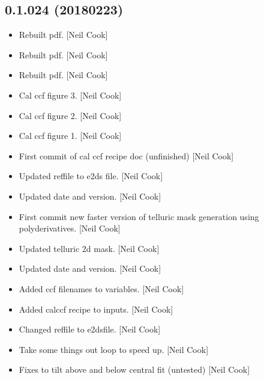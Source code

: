 \documentclass[a4paper,10pt,english]{report}
\begin{document}
\subsection{0.1.024 (2018\sphinxhyphen{}02\sphinxhyphen{}23)}
\label{\detokenize{misc/changelog:id499}}\begin{itemize}
\item {} 
Rebuilt pdf. {[}Neil Cook{]}

\item {} 
Rebuilt pdf. {[}Neil Cook{]}

\item {} 
Rebuilt pdf. {[}Neil Cook{]}

\item {} 
Cal ccf figure 3. {[}Neil Cook{]}

\item {} 
Cal ccf figure 2. {[}Neil Cook{]}

\item {} 
Cal ccf figure 1. {[}Neil Cook{]}

\item {} 
First commit of cal ccf recipe doc (unfinished) {[}Neil Cook{]}

\item {} 
Updated reffile to e2ds file. {[}Neil Cook{]}

\item {} 
Updated date and version. {[}Neil Cook{]}

\item {} 
First commit \sphinxhyphen{} new faster version of telluric mask generation \sphinxhyphen{} using
polyderivatives. {[}Neil Cook{]}

\item {} 
Updated telluric 2d mask. {[}Neil Cook{]}

\item {} 
Updated date and version. {[}Neil Cook{]}

\item {} 
Added ccf filenames to variables. {[}Neil Cook{]}

\item {} 
Added calccf recipe to inputs. {[}Neil Cook{]}

\item {} 
Changed reffile to e2dsfile. {[}Neil Cook{]}

\item {} 
Take some things out loop to speed up. {[}Neil Cook{]}

\item {} 
Fixes to tilt above and below central fit (untested) {[}Neil Cook{]}


\end{itemize}
\end{document}
